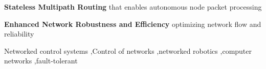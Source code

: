 \documentclass[preprint,12pt]{elsarticle}
\begin{document}
\begin{frontmatter}
\author{Douglas Kogut}


\begin{abstract}
	
\end{abstract}

\begin{highlights}
\item \textbf{Stateless Multipath Routing} that enables autonomous node packet processing
\item \textbf{Enhanced Network Robustness and Efficiency} optimizing network flow and reliability
\end{highlights}

\begin{keyword}
	Networked control systems \sep Control of networks \sep networked robotics \sep computer networks \sep fault-tolerant
\end{keyword}

\end{frontmatter}











\newpage



\appendix

\end{document}
